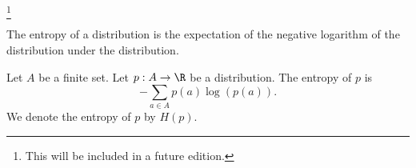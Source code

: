 
\footnote{This will be included in a future edition.}


The entropy of a distribution
is the
expectation of the negative
logarithm of the distribution
under the distribution.


Let $A$ be a finite set.
Let $p:A \to \R$ be a distribution.
The entropy of $p$ is
\[
  -\sum_{a \in A} p(a) \log(p(a)).
\]
We denote the entropy of $p$ by
$H(p)$.

\blankpage
